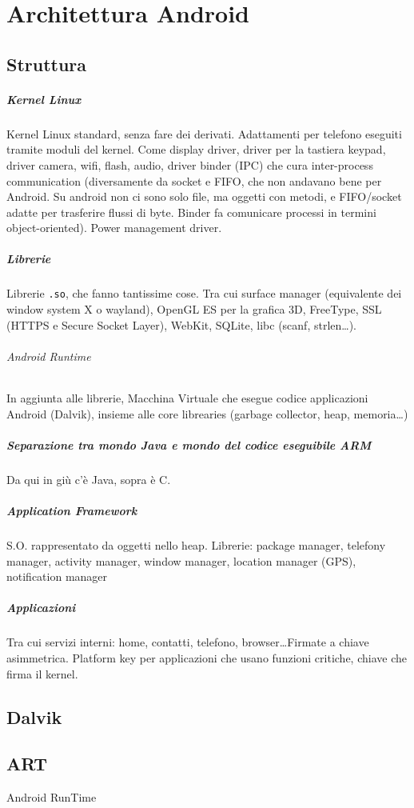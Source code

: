 \documentclass[10pt]{book}
\begin{document}
\chapter{Architettura Android}
\section{Struttura}
\paragraph{Kernel Linux} Kernel Linux standard, senza fare dei derivati. Adattamenti per telefono eseguiti tramite moduli del kernel. Come display driver, driver per la tastiera keypad, driver camera, wifi, flash, audio, driver binder (IPC) che cura inter-process communication (diversamente da socket e FIFO, che non andavano bene per Android. Su android non ci sono solo file, ma oggetti con metodi, e FIFO/socket adatte per trasferire flussi di byte. Binder fa comunicare processi in termini object-oriented). Power management driver.
\paragraph{Librerie} Librerie \texttt{.so}, che fanno tantissime cose. Tra cui surface manager (equivalente dei window system X o wayland), OpenGL ES per la grafica 3D, FreeType, SSL (HTTPS e Secure Socket Layer), WebKit, SQLite, libc (scanf, strlen\ldots).
\subparagraph{Android Runtime} In aggiunta alle librerie, Macchina Virtuale che esegue codice applicazioni Android (Dalvik), insieme alle core librearies (garbage collector, heap, memoria\ldots)
\paragraph{Separazione tra mondo Java e mondo del codice eseguibile ARM} Da qui in giù c'è Java, sopra è C.
\paragraph{Application Framework} S.O. rappresentato da oggetti nello heap. Librerie: package manager, telefony manager, activity manager, window manager, location manager (GPS), notification manager
\paragraph{Applicazioni} Tra cui servizi interni: home, contatti, telefono, browser\ldots Firmate a chiave asimmetrica. Platform key per applicazioni che usano funzioni critiche, chiave che firma il kernel.
\section{Dalvik}
\section{ART}
Android RunTime
\end{document}
